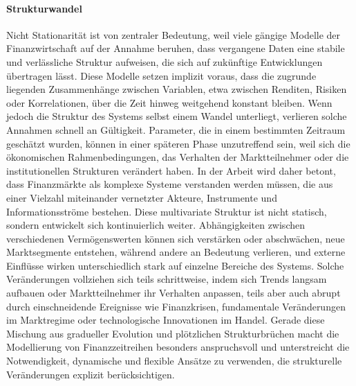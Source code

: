 \paragraph{Strukturwandel} 
Nicht Stationarität ist von zentraler Bedeutung, weil viele gängige Modelle der Finanzwirtschaft auf der Annahme beruhen, dass vergangene Daten eine stabile und verlässliche Struktur aufweisen, die sich auf zukünftige Entwicklungen übertragen lässt. Diese Modelle setzen implizit voraus, dass die zugrunde liegenden Zusammenhänge zwischen Variablen, etwa zwischen Renditen, Risiken oder Korrelationen, über die Zeit hinweg weitgehend konstant bleiben. Wenn jedoch die Struktur des Systems selbst einem Wandel unterliegt, verlieren solche Annahmen schnell an Gültigkeit. Parameter, die in einem bestimmten Zeitraum geschätzt wurden, können in einer späteren Phase unzutreffend sein, weil sich die ökonomischen Rahmenbedingungen, das Verhalten der Marktteilnehmer oder die institutionellen Strukturen verändert haben. In der Arbeit wird daher betont, dass Finanzmärkte als komplexe Systeme verstanden werden müssen, die aus einer Vielzahl miteinander vernetzter Akteure, Instrumente und Informationsströme bestehen. Diese multivariate Struktur ist nicht statisch, sondern entwickelt sich kontinuierlich weiter. Abhängigkeiten zwischen verschiedenen Vermögenswerten können sich verstärken oder abschwächen, neue Marktsegmente entstehen, während andere an Bedeutung verlieren, und externe Einflüsse wirken unterschiedlich stark auf einzelne Bereiche des Systems. Solche Veränderungen vollziehen sich teils schrittweise, indem sich Trends langsam aufbauen oder Marktteilnehmer ihr Verhalten anpassen, teils aber auch abrupt durch einschneidende Ereignisse wie Finanzkrisen, fundamentale Veränderungen im Marktregime oder technologische Innovationen im Handel. Gerade diese Mischung aus gradueller Evolution und plötzlichen Strukturbrüchen macht die Modellierung von Finanzzeitreihen besonders anspruchsvoll und unterstreicht die Notwendigkeit, dynamische und flexible Ansätze zu verwenden, die strukturelle Veränderungen explizit berücksichtigen.
